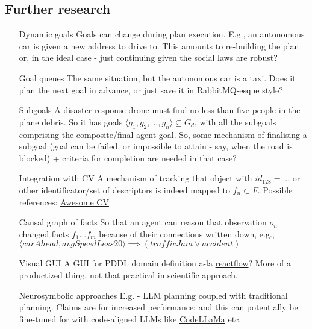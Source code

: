 \documentclass[fleqn,10pt]{olplainarticle}
\begin{document}
\subsection{Further research}
\begin{itemize}
    \item [Dynamic goals] Goals can change during plan execution. E.g., an autonomous car is given a new address to drive to. This amounts to re-building the plan or, in the ideal case - just continuing given the social laws are robust?
    \item [Goal queues] The same situation, but the autonomous car is a taxi. Does it plan the next goal in advance, or just save it in RabbitMQ-esque style?
    \item [Subgoals] A disaster response drone must find no less than five people in the plane debris. So it has goals $\langle g_1, g_2, ..., g_n \rangle \subseteq G_d$, with all the subgoals comprising the composite/final agent goal. So, some mechanism of finalising a subgoal (goal can be failed, or impossible to attain - say, when the road is blocked) + criteria for completion are needed in that case?
\item [Integration with CV] A mechanism of tracking that object with $id_{128}=...$ or other identificator/set of descriptors is indeed mapped to $f_n \subset F$. Possible references: \href{https://github.com/jbhuang0604/awesome-computer-vision}{Awesome CV}
\item [Causal graph of facts] So that an agent can reason that observation $o_n$ changed facts $f_1...f_m$ because of their connections written down, e.g., $\langle carAhead, avgSpeedLess20 \rangle \implies (trafficJam \lor accident)$
\item [Visual GUI] A GUI for PDDL domain definition a-la \href{https://reactflow.dev/}{reactflow}? More of a productized thing, not that practical in scientific approach.
\item [Neurosymbolic approaches] E.g. \cite{dagan_dynamic_2023} - LLM planning coupled with traditional planning. Claims are for increased performance; and this can potentially be fine-tuned for with code-aligned LLMs like \href{https://github.com/facebookresearch/codellama}{CodeLLaMa} etc.
\end{itemize}

% 
\printbibliography
\end{document}
